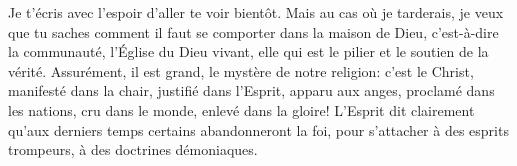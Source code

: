 Je t’écris avec l’espoir d’aller te voir bientôt.
Mais au cas où je tarderais,
	je veux que tu saches comment il faut se comporter dans la maison de Dieu,
	c’est-à-dire la communauté, l’Église du Dieu vivant,
	elle qui est le pilier et le soutien de la vérité.
Assurément, il est grand, le mystère de notre religion:
	c’est le Christ, manifesté dans la chair, justifié dans l’Esprit,
	apparu aux anges, proclamé dans les nations,
	cru dans le monde, enlevé dans la gloire!
L’Esprit dit clairement qu’aux derniers temps certains abandonneront la foi,
	pour s’attacher à des esprits trompeurs, à des doctrines démoniaques.
